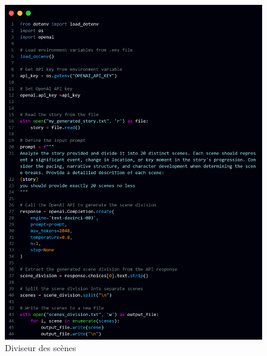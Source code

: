 \documentclass[11,5pt]{report}
\begin{document}
\begin{spacing}{2}
\begin{spacing}{2}
\begin{figure}[htbp]
    \centering
    \includegraphics[keepaspectratio=true,scale=0.4]{images/division.png}
    \caption{Diviseur des scènes}
    \label{fig:dividor}
\end{figure}


\end{spacing}
\end{spacing}
\end{document}

